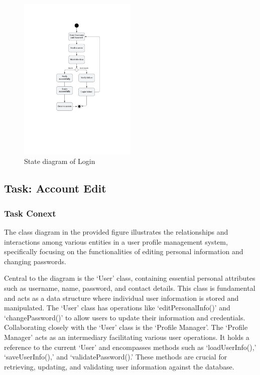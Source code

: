 \documentclass[conference]{IEEEtran}
\begin{document}
\begin{figure}[htbp]
	\centerline{\includegraphics[width=0.5\textwidth]{Diagram_of_Login_and_Register/State_diagram_of_login.pdf}}
	\caption{State diagram of Login }
	\label{State_diagram_of_login}
\end{figure}
\subsection{\textbf{Task: Account Edit }}

\subsubsection{\textbf{Task Conext }}
\textbf{ }

The class diagram in the provided figure illustrates the relationships and interactions among various entities in a user profile management system, specifically focusing on the functionalities of editing personal information and changing passwords.

Central to the diagram is the ‘User’ class, containing essential personal attributes such as username, name, password, and contact details. This class is fundamental and acts as a data structure where individual user information is stored and manipulated. The ‘User’ class has operations like ‘editPersonalInfo()’ and ‘changePassword()’ to allow users to update their information and credentials.
Collaborating closely with the ‘User’ class is the ‘Profile Manager’. The ‘Profile Manager’ acts as an intermediary facilitating various user operations. It holds a reference to the current ‘User’ and encompasses methods such as ‘loadUserInfo(),’ ‘saveUserInfo(),’ and ‘validatePassword().’ These methods are crucial for retrieving, updating, and validating user information against the database.
\end{document}
